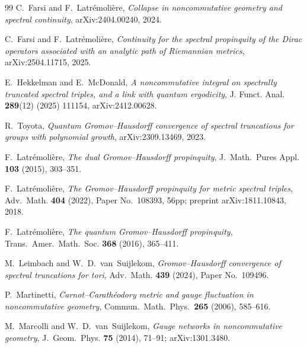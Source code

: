 \documentclass[11pt,a4paper]{article}
\theoremstyle{plain}
\theoremstyle{definition}
\begin{document}
\begin{thebibliography}{99}
C.~Farsi and F.~Latr\'emoli\`ere,
\newblock \emph{Collapse in noncommutative geometry and spectral
continuity},
\newblock arXiv:2404.00240, 2024.

C.~Farsi and F.~Latr\'emoli\`ere,
\newblock \emph{Continuity for the spectral propinquity of the
Dirac operators associated with an analytic path of Riemannian
metrics},
\newblock arXiv:2504.11715, 2025.

E.~Hekkelman and E.~McDonald,
\newblock \emph{A noncommutative integral on spectrally truncated
spectral triples, and a link with quantum ergodicity},
\newblock J. Funct. Anal. \textbf{289}(12) (2025) 111154, arXiv:2412.00628.

R.~Toyota,
\newblock \emph{Quantum Gromov--Hausdorff convergence of spectral
truncations for groups with polynomial growth},
\newblock arXiv:2309.13469, 2023.

F.~Latr\'emoli\`ere,
\newblock \emph{The dual Gromov--Hausdorff propinquity},
\newblock J.~Math.~Pures Appl. \textbf{103} (2015), 303--351.

F.~Latr\'emoli\`ere,
\newblock \emph{The Gromov--Hausdorff propinquity for metric spectral
triples},
\newblock Adv.~Math. \textbf{404} (2022), Paper No.~108393, 56pp;
\newblock preprint arXiv:1811.10843, 2018.

F.~Latr\'emoli\`ere,
\newblock \emph{The quantum Gromov--Hausdorff propinquity},
\newblock Trans.~Amer.~Math.~Soc. \textbf{368} (2016), 365--411.

M.~Leimbach and W.~D.~van~Suijlekom,
\newblock \emph{Gromov--Hausdorff convergence of spectral truncations
for tori},
\newblock Adv.~Math. \textbf{439} (2024), Paper No.~109496.

P.~Martinetti, \emph{Carnot--Carath\'eodory metric and gauge fluctuation
in noncommutative geometry}, Commun.\ Math.\ Phys.\ \textbf{265} (2006),
585--616.

M.~Marcolli and W.~D.~van~Suijlekom,
\newblock \emph{Gauge networks in noncommutative geometry},
\newblock J.~Geom.~Phys. \textbf{75} (2014), 71--91;
\newblock arXiv:1301.3480.


\end{thebibliography}
\end{document}
